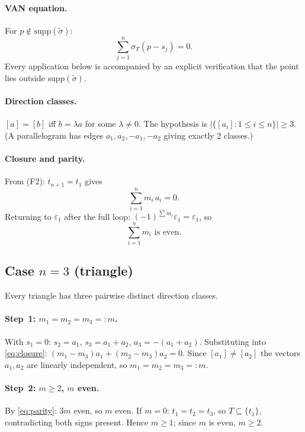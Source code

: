 \paragraph{VAN equation.}
For $p\notin\mathrm{supp}(\tilde\sigma)$:
\begin{equation}\label{eq:VAN}
  \sum_{j=1}^n \sigma_T(p-s_j)=0. \tag{VAN}
\end{equation}
Every application below is accompanied by an explicit verification that
the point lies outside $\mathrm{supp}(\tilde\sigma)$.

\paragraph{Direction classes.}
$[a]=[b]$ iff $b=\lambda a$ for some $\lambda\ne0$.
The hypothesis is $|\{[a_i]:1\le i\le n\}|\ge3$.
(A parallelogram has edges $a_1,a_2,-a_1,-a_2$ giving exactly 2 classes.)

\paragraph{Closure and parity.}
From (F2): $t_{n+1}=t_1$ gives
\begin{equation}\label{eq:closure}\textstyle
  \sum_{i=1}^n m_i\,a_i=0.\tag{Cl}
\end{equation}
Returning to $\varepsilon_1$ after the full loop: $(-1)^{\sum m_i}\varepsilon_1=\varepsilon_1$, so
\begin{equation}\label{eq:parity}\textstyle
  \sum_{i=1}^n m_i\text{ is even.}\tag{Par}
\end{equation}

\subsection*{Case $n=3$ (triangle)}

Every triangle has three pairwise distinct direction classes.

\paragraph{Step~1: $m_1=m_2=m_3=:m$.}
With $s_1=0$: $s_2=a_1$, $s_3=a_1+a_2$, $a_3=-(a_1+a_2)$.
Substituting into \eqref{eq:closure}: $(m_1-m_3)a_1+(m_2-m_3)a_2=0$.
Since $[a_1]\ne[a_2]$ the vectors $a_1,a_2$ are linearly independent,
so $m_1=m_2=m_3=:m$.

\paragraph{Step~2: $m\ge2$, $m$ even.}
By \eqref{eq:parity}: $3m$ even, so $m$ even.
If $m=0$: $t_1=t_2=t_3$, so $T\subseteq\{t_1\}$, contradicting both signs present.
Hence $m\ge1$; since $m$ is even, $m\ge2$.

